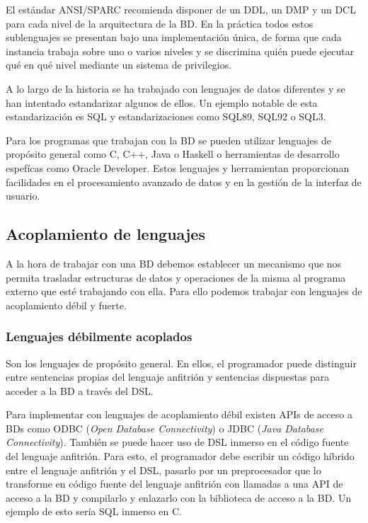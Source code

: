 El estándar ANSI/SPARC recomienda disponer de un DDL, un DMP y un DCL para cada nivel de la arquitectura de la BD\@.
En la práctica todos estos sublenguajes se presentan bajo una implementación única, de forma que cada instancia trabaja sobre uno o varios niveles y se discrimina quién puede ejecutar qué en qué nivel mediante un sistema de privilegios.

A lo largo de la historia se ha trabajado con lenguajes de datos diferentes y se han intentado estandarizar algunos de ellos.
Un ejemplo notable de esta estandarización es SQL y estandarizaciones como SQL89, SQL92 o SQL3.

Para los programas que trabajan con la BD se pueden utilizar lenguajes de propósito general como C, C++, Java o Haskell o herramientas de desarrollo espefícas como Oracle Developer.
Estos lenguajes y herramientan proporcionan facilidades en el procesamiento avanzado de datos y en la gestión de la interfaz de usuario.

\subsection{Acoplamiento de lenguajes}

A la hora de trabajar con una BD debemos establecer un mecanismo que nos permita trasladar estructuras de datos y operaciones de la misma al programa externo que esté trabajando con ella.
Para ello podemos trabajar con lenguajes de acoplamiento débil y fuerte.

\subsubsection{Lenguajes débilmente acoplados}

Son los lenguajes de propósito general.
En ellos, el programador puede distinguir entre sentencias propias del lenguaje anfitrión y sentencias dispuestas para acceder a la BD a través del DSL\@.

Para implementar con lenguajes de acoplamiento débil existen APIs de acceso a BDs como ODBC (\textit{Open Database Connectivity}) o JDBC (\textit{Java Database Connectivity}).
También se puede hacer uso de DSL inmerso en el código fuente del lenguaje anfitrión.
Para esto, el programador debe escribir un código híbrido entre el lenguaje anfitrión y el DSL, pasarlo por un preprocesador que lo transforme en código fuente del lenguaje anfitrión con llamadas a una API de acceso a la BD y compilarlo y enlazarlo con la biblioteca de acceso a la BD\@.
Un ejemplo de esto sería SQL inmerso en C.


